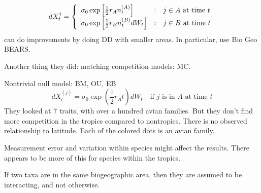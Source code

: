 \documentclass{article}
\begin{document}
\begin{equation*}
  dX_{t}^{j} = \left\{ \begin{array}{l@{\quad:\quad}l}
      \sigma_{0}\exp \left[ \frac{1}{2}r_{A}n_{t}^{(A)}
      \right] & j\in A \text{ at time }t
      \\ \sigma_{0}\exp \left[ \frac{1}{2}r_{B}n_{t}^{(B)}dW_{t} \right]
      &j\in B \text{ at time }t \end{array}\right.
\end{equation*}
can do improvements by doing DD with smaller areas. In particular, use Bio Geo
BEARS.

Another thing they did: matching competition models: MC.

Nontrivial null model: BM, OU, EB
\begin{equation*}
  dX_{t}^{(j)} =\sigma_{0} \exp \left( \frac{1}{2}r_{A}t \right)dW_{t}
  \quad\text{if $j$ is in $A$ at time $t$} 
\end{equation*}
They looked at 7 traits, with over a hundred avian families. But they don't find
more competition in the tropics compared to nontropics. There is no observed
relationship to latitude. Each of the colored dots is an avian family.

Measurement error and variation within species might affect the results. There
appears to be more of this for species within the tropics.

If two taxa are in the same biogeographic area, then they are assumed to be
interacting, and not otherwise.
\end{document}
